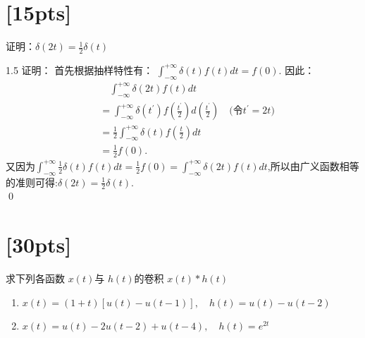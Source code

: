 \documentclass[a4paper,UTF8]{article}
\numberwithin{equation}{section}
\begin{document}
\newpage
\section{[15pts]}
证明：$\delta(2t)=\frac{1}{2}\delta(t)$

\begin{framed}
    \begin{spacing}{1.5}
      证明：
      首先根据抽样特性有：
      $\int_{-\infty}^{+\infty}\delta(t)f(t)dt = f(0)$.
      因此：
      \begin{align*}
      	&\quad\int_{-\infty}^{+\infty}\delta(2t)f(t)dt\\
      	&= \int_{-\infty}^{+\infty}\delta(t^\prime)f(\frac{t^\prime}{2})d(\frac{t^\prime}{2}) \quad\text{(令$t^\prime = 2t$)}\\
      	&= \frac{1}{2}\int_{-\infty}^{+\infty}\delta(t)f(\frac{t}{2})dt\\
      	&= \frac{1}{2}f(0).
      \end{align*}
      又因为$\int_{-\infty}^{+\infty}\frac{1}{2}\delta(t)f(t)dt = \frac{1}{2}f(0) = \int_{-\infty}^{+\infty}\delta(2t)f(t)dt $,所以由广义函数相等的准则可得:$\delta(2t)=\frac{1}{2}\delta(t)$.\\
      \qed
    \end{spacing}
\end{framed}
\newpage




\newpage
\section{[30pts]}
求下列各函数 $x(t)$与 $h(t)$的卷积 $x(t)* h(t)$
\begin{enumerate}[(1)]
    \item $x(t)=(1+t)[u(t)-u(t-1)], \quad h(t)=u(t)-u(t-2)$
    \item $ x(t) = u(t) -2u(t-2) + u(t-4), \quad h(t)=e^{2t} $
\end{enumerate}
\end{document}
